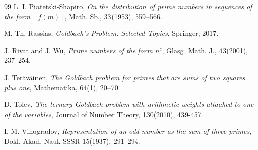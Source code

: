 \documentclass{amsart}
\numberwithin{equation}{subsection}
\begin{document}
\begin{thebibliography}{99}
 L. I. Piatetski-Shapiro, \textit{On the distribution of prime numbers in sequences of the form $[f(m)]$}, Math. Sb., 33(1953), 559--566.

 M. Th. Rassias, \textit{Goldbach's Problem: Selected Topics}, Springer, 2017.


 J. Rivat and J. Wu, \textit{Prime numbers of the form $n^c$}, Glasg. Math. J., 43(2001), 237--254.






 J. Ter\"{a}v\"{a}inen, \textit{The Goldbach problem for primes that are sums of two squares plus one}, Mathematika, 64(1), 20--70.

 D. Tolev, \textit{The ternary Goldbach problem with arithmetic weights attached to one of the variables}, Journal of Number Theory, 130(2010), 439-457.


 I. M. Vinogradov, \textit{Representation of an odd number as the sum of three primes}, Dokl. Akad. Nauk SSSR 15(1937), 291--294.

\end{thebibliography}
\end{document}
